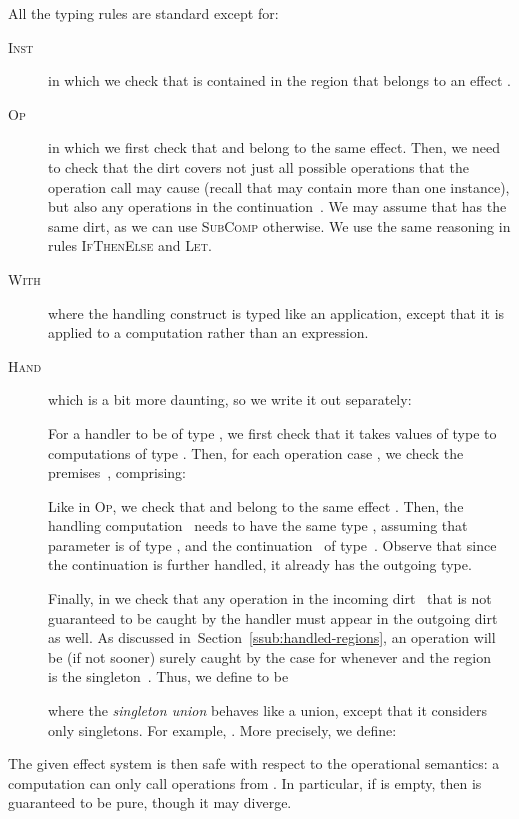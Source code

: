 \documentclass{LMCS}
\newcommand{\rulename}[1]{{\mdseries \small \textsc{#1}}}
\begin{document}
All the typing rules are standard except for:
\begin{description}
\item[\rulename{Inst}]
  in which we check that  is contained in the region  that belongs to an effect .
\item[\rulename{Op}]
  in which we first check that  and  belong to the same effect.
  Then, we need to check that the dirt  covers not just all possible operations that the operation call may cause
  (recall that  may contain more than one instance), but also any operations in the continuation~.
  We may assume that  has the same dirt, as we can use \rulename{SubComp} otherwise.
  We use the same reasoning in rules \rulename{IfThenElse} and \rulename{Let}.
\item[\rulename{With}]
  where the handling construct is typed like an application,
  except that it is applied to a computation rather than an expression.
\item[\rulename{Hand}]
  which is a bit more daunting, so we write it out separately:
  
  For a handler to be of type ,
  we first check that it takes values of type  to computations of type .
  Then, for each operation case , we check the premises~,
  comprising:
  
  Like in \rulename{Op}, we check that  and  belong to the same effect .
  Then, the handling computation~ needs to have the same type ,
  assuming that parameter  is of type ,
  and the continuation~ of type~.
  Observe that since the continuation is further handled, it already has the outgoing type.

  Finally, in  we check that any operation in the incoming dirt~
  that is not guaranteed to be caught by the handler
  must appear in the outgoing dirt~ as well.
  As discussed in~Section~\ref{ssub:handled-regions},
  an operation  will be (if not sooner)
  surely caught by the case for 
  whenever  and the region~ is the singleton~.
  Thus, we define  to be
  
  where the \emph{singleton union}  behaves like a union, except that it considers only singletons.
  For example, .
  More precisely, we define:
  
\end{description}\medskip

\noindent The given effect system is then safe with respect to the operational semantics:
a computation  can only call operations from .
In particular, if  is empty, then  is guaranteed to be pure, though it may diverge.
\end{document}
